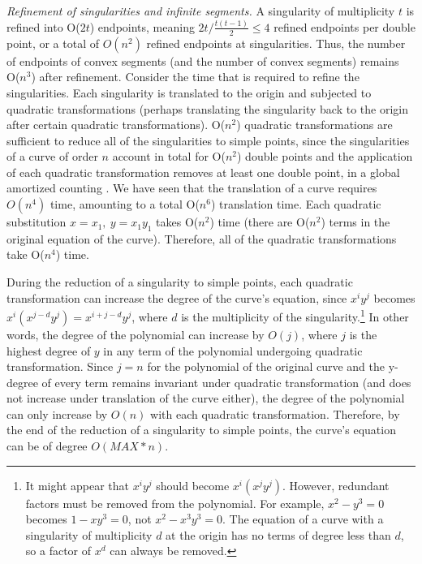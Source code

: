 {\em Refinement of singularities and infinite segments.}
%
A singularity of multiplicity $t$ is refined into O($2t$) endpoints, meaning
$2t / \frac{t(t-1)}{2} \leq 4$ refined endpoints per double point,
or a total of $O(n^{2})$ refined endpoints at singularities.
Thus, the number of endpoints of convex segments 
(and the number of convex segments) remains O($n^{3}$) after refinement.
Consider the time that is required to refine the singularities.
Each singularity is translated to the origin and subjected to quadratic transformations
(perhaps translating the singularity back to the origin after certain quadratic 
transformations).
O($n^{2}$) quadratic transformations are sufficient to reduce all of the singularities 
to simple points, since the singularities of a curve of order $n$ account in total for 
O($n^{2}$) double points and the application of each quadratic transformation 
removes at least one double point, in a global amortized counting \cite{abba3}. 
We have seen that the translation of a curve requires $O(n^{4})$ time, 
amounting to a total O($n^{6}$) translation time. 
Each quadratic substitution $x = x_{1},\ y = x_{1}y_{1}$ takes O($n^{2}$) time 
(there are O($n^2$) terms in the original equation of the curve).
Therefore, all of the quadratic transformations take O($n^{4}$) time.

During the reduction of a singularity to simple points, each quadratic
transformation can increase the degree of the curve's equation, since
$x^{i}y^{j}$ becomes $x^{i}(x^{j-d}y^{j}) = x^{i+j-d}y^{j}$, where $d$ is the 
multiplicity of the singularity.\footnote{It might appear that 
	$x^{i}y^{j}$ should become $x^{i}(x^{j}y^{j})$.  However,  
	redundant factors must be removed from the polynomial.
	For example, $x^{2} - y^{3} = 0$
	becomes $1-xy^{3} = 0$, not $x^{2} - x^{3}y^{3} = 0$.
	The equation of a curve with a singularity of multiplicity $d$ 
	at the origin has no terms of degree less than $d$, so a factor of $x^{d}$ can
	always be removed.}
In other words, the degree of the polynomial can increase by $O(j)$, where
$j$ is the highest degree of $y$ in any term of the polynomial undergoing 
quadratic transformation. 
Since $j=n$ for the polynomial of the original curve and the y-degree of every term
remains invariant under quadratic transformation (and does not increase under
translation of the curve either), the degree of the polynomial can only increase
by $O(n)$ with each quadratic transformation.
Therefore, by the end of the reduction of a singularity to simple points, 
the curve's equation can be of degree $O(MAX * n)$.


